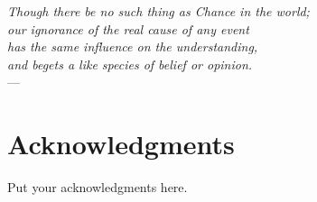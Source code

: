 
\begin{flushright}{\slshape    
Though there be no such thing as Chance in the world; \\
our ignorance of the real cause of any event \\
has the same influence on the understanding, \\
and begets a like species of belief or opinion.} \\ \medskip
    ---  \citep{hume:1902}
\end{flushright}



\bigskip

\begingroup
\let\clearpage\relax
\let\cleardoublepage\relax
\let\cleardoublepage\relax
\chapter*{Acknowledgments}
Put your acknowledgments here.

\endgroup



